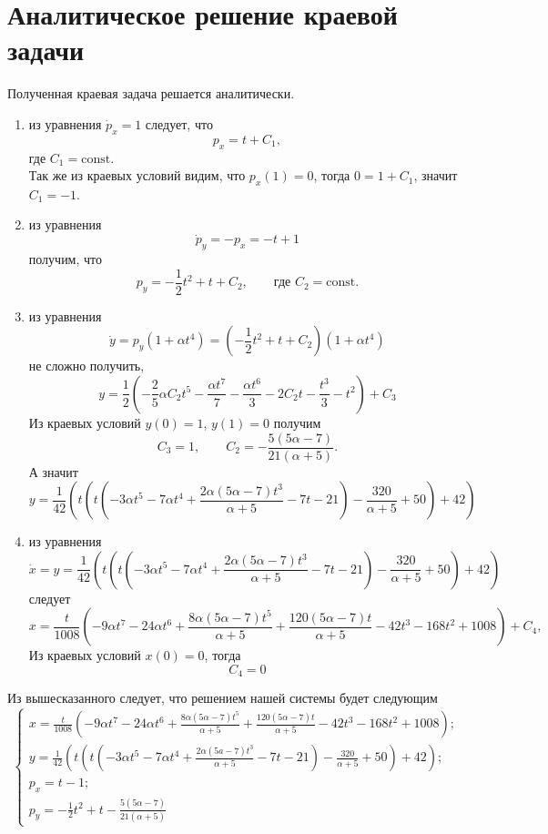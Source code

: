 \section{Аналитическое решение краевой задачи}
Полученная краевая задача решается аналитически.
\begin{enumerate}
\item из уравнения $\dot{p}_x = 1$ следует, что 
\[
p_x = t + C_1,
\] 
где $C_1 = \mathrm{const}$.\\
Так же из краевых условий видим, что $p_x(1) = 0$, тогда $0 = 1 + C_1$, значит $C_1 = -1$.
\item из уравнения 
\[
\dot{p}_y = - p_x = - t + 1
\]
 получим, что 
 \[
 p_y = -\frac{1}{2} t^2 + t + C_2,
 \qquad 
\text{где } C_2 = \mathrm{const}.
\]
\item  из уравнения 
\[
\dot{y} = p_y (1 + \alpha t^4) = (-\frac{1}{2} t^2 + t + C_2)(1 + \alpha t^4)
\]
 не сложно получить, 
\[
y = \frac{1}{2} \left(-\frac{2}{5} \alpha C_2 t^5-\frac{\alpha t^7}{7}-\frac{\alpha t^6}{3}-2 C_2 t-\frac{t^3}{3}-t^2\right)+C_3
\]
Из краевых условий $y(0) = 1$, $y(1) = 0$ получим
\[
C_3 = 1, \qquad C_2 = -\frac{5 (5 \alpha -7)}{21 (\alpha + 5)}.
\]
А значит 
\[
y = \frac{1}{42} \left(t \left(t \left(-3 \alpha t^5-7 \alpha t^4+\frac{2 \alpha(5 \alpha-7) t^3}{\alpha + 5}-7 t-21\right)-\frac{320}{\alpha + 5}+50\right)+42\right)
\]
\item из уравнения 
\[
\dot{x} = y = \frac{1}{42} \left(t \left(t \left(-3 \alpha t^5-7 \alpha t^4+\frac{2 \alpha(5 \alpha-7) t^3}{\alpha + 5}-7 t-21\right)-\frac{320}{\alpha + 5}+50\right)+42\right)
\]
следует
\[
x = \frac{t}{1008} \left(-9 \alpha t^7-24 \alpha t^6+\frac{8 \alpha (5 \alpha-7) t^5}{\alpha+5}+\frac{120 (5 \alpha-7) t}{\alpha+5}-42 t^3-168 t^2+1008\right) + C_4,
\]
Из краевых условий $x(0) = 0$, тогда
\[
C_4 = 0
\]
\end{enumerate}

Из вышесказанного следует, что решением нашей системы будет следующим
\[
	\begin{cases}
	x = \frac{t}{1008} \left(-9 \alpha t^7-24 \alpha t^6+\frac{8 \alpha (5 \alpha-7) t^5}{\alpha+5}+\frac{120 (5 \alpha-7) t}{\alpha+5}-42 t^3-168 t^2+1008\right); \\
	y = \frac{1}{42} \left(t \left(t \left(-3 \alpha t^5-7 \alpha t^4+\frac{2 \alpha(5 a-7) t^3}{\alpha + 5}-7 t-21\right)-\frac{320}{\alpha + 5}+50\right)+42\right);\\
	p_x = t - 1;\\
	p_y =  -\frac{1}{2} t^2 + t -\frac{5 (5 \alpha -7)}{21 (\alpha + 5)}
	\end{cases}
\]